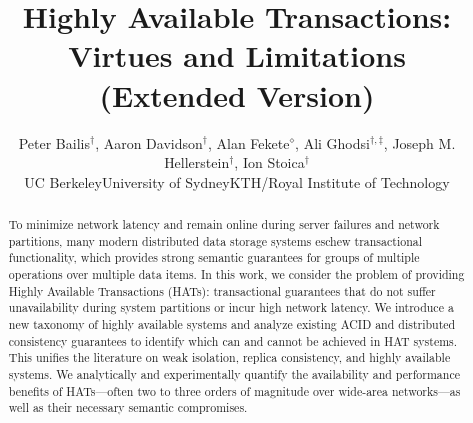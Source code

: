 \documentclass{vldb}
\theoremstyle{definition}
\begin{document}

\title{Highly Available Transactions: Virtues and Limitations\\(Extended Version)}
{\author{Peter Bailis{\fontsize{12}{14}$^\dagger$}, Aaron Davidson{\fontsize{12}{14}$^\dagger$}, Alan Fekete{\fontsize{12}{14}$^\diamond$}, Ali Ghodsi{\fontsize{12}{14}$^{\dagger,\ddagger}$}, Joseph M. Hellerstein{\fontsize{12}{14}$^\dagger$}, Ion Stoica{\fontsize{12}{14}$^\dagger$}\\{\affaddr{\fontsize{12}{14}$^\dagger$}\hspace{.5mm}UC Berkeley\hspace{4mm}{\fontsize{12}{14}$^\diamond$}\hspace{.5mm}University of Sydney\hspace{4mm}{\fontsize{12}{14}$^\ddagger$}\hspace{.5mm}KTH/Royal Institute of Technology}}}
\maketitle

\begin{abstract}
\noindent To minimize network latency and remain online during server
failures and network partitions, many modern distributed data storage
systems eschew transactional functionality, which provides strong
semantic guarantees for groups of multiple operations over multiple
data items. In this work, we consider the problem of providing Highly
Available Transactions (HATs): transactional guarantees that do not
suffer unavailability during system partitions or incur high network
latency.  We introduce a new taxonomy of highly available systems and
analyze existing ACID and distributed consistency guarantees to
identify which can and cannot be achieved in HAT systems. This unifies
the literature on weak isolation, replica consistency, and highly
available systems. We analytically and experimentally quantify the
availability and performance benefits of HATs---often two to three
orders of magnitude over wide-area networks---as well as their
necessary semantic compromises.
\end{abstract}\vspace{-.5em}








\end{document}
